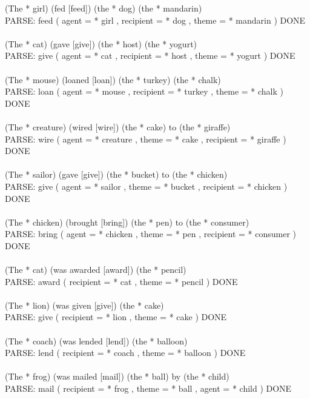 \documentclass{article} \usepackage{iclr2022_conference,times}
\newcommand{\prompt}[1]{{\footnotesize \textsf{#1}}}
\begin{document}
\prompt{(The * girl) (fed [feed]) (the * dog) (the * mandarin) \\
PARSE: feed ( agent = * girl , recipient = * dog , theme = * mandarin ) DONE \\
 \\
(The * cat) (gave [give]) (the * host) (the * yogurt) \\
PARSE: give ( agent = * cat , recipient = * host , theme = * yogurt ) DONE \\
 \\
(The * mouse) (loaned [loan]) (the * turkey) (the * chalk) \\
PARSE: loan ( agent = * mouse , recipient = * turkey , theme = * chalk ) DONE \\
 \\
(The * creature) (wired [wire]) (the * cake) to (the * giraffe) \\
PARSE: wire ( agent = * creature , theme = * cake , recipient = * giraffe ) DONE \\
 \\
(The * sailor) (gave [give]) (the * bucket) to (the * chicken) \\
PARSE: give ( agent = * sailor , theme = * bucket , recipient = * chicken ) DONE \\
 \\
(The * chicken) (brought [bring]) (the * pen) to (the * consumer) \\
PARSE: bring ( agent = * chicken , theme = * pen , recipient = * consumer ) DONE \\
 \\
(The * cat) (was awarded [award]) (the * pencil) \\
PARSE: award ( recipient = * cat , theme = * pencil ) DONE \\
 \\
(The * lion) (was given [give]) (the * cake) \\
PARSE: give ( recipient = * lion , theme = * cake ) DONE \\
 \\
(The * coach) (was lended [lend]) (the * balloon) \\
PARSE: lend ( recipient = * coach , theme = * balloon ) DONE \\
 \\
(The * frog) (was mailed [mail]) (the * ball) by (the * child) \\
PARSE: mail ( recipient = * frog , theme = * ball , agent = * child ) DONE \\
 \\
}
\end{document}
